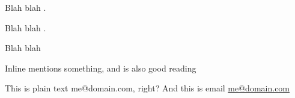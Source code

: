 Blah blah \citetext{\citealp[see][pp. 33-35]{Fis00a}, \citealp[also][ch. 1]{Meskin2007}}.

Blah blah \citetext{\citealp[][pp. 33-35, 38-39]{Fis00a} and \emph{passim}}.

Blah blah \citetext{\citealp[][]{Meskin2007}, \citealp[][]{Fis00a}}

Inline \citet{Meskin2007} mentions something, and \citet{Fis00a} is also good reading

This is plain text me@domain.com, right? And this is email \href{mailto:me@domain.com}{me@domain.com}

